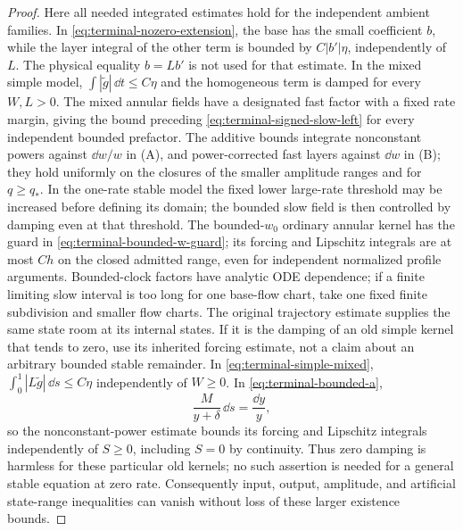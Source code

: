 \begin{proof}
Here all needed integrated estimates hold for the independent ambient
families.  In \eqref{eq:terminal-nozero-extension}, the base has the small
coefficient \(b\), while the layer integral of the other term is bounded
by \(C|b'|\eta\), independently of \(L\).  The physical equality
\(b=Lb'\) is not used for that estimate.  In the mixed simple model,
\(\int|\widetilde g|\,\dd t\le C\eta\) and the homogeneous term is
damped for every \(W,L>0\).  The mixed annular fields have a designated
fast factor with a fixed rate margin, giving the bound preceding
\eqref{eq:terminal-signed-slow-left} for every independent bounded
prefactor.  The additive bounds integrate nonconstant powers against
\(\dd w/w\) in (A), and power-corrected fast layers against \(\dd w\)
in (B); they hold uniformly on the closures of the smaller amplitude
ranges and for \(q\ge q_*\).  In the one-rate stable model the fixed
lower large-rate threshold may be increased before defining its domain;
the bounded slow field is then controlled by damping even at that
threshold.  The bounded-\(w_0\) ordinary annular kernel has the guard
in \eqref{eq:terminal-bounded-w-guard}; its forcing and Lipschitz
integrals are at most \(Ch\) on the closed admitted range, even for
independent normalized profile arguments.  Bounded-clock factors have
analytic ODE dependence; if a
finite limiting slow interval is too long for one base-flow chart, take
one fixed finite subdivision and smaller flow charts.  The original
trajectory estimate supplies the same state room at its internal states.
If it is the damping of an old simple kernel that tends to zero, use its
inherited forcing estimate, not a claim about an arbitrary bounded stable
remainder.  In \eqref{eq:terminal-simple-mixed},
\(\int_0^1|L\widetilde g|\,\dd s\le C\eta\) independently of
\(W\ge0\).  In \eqref{eq:terminal-bounded-a},
\[
 \frac{M}{y+\delta}\,\dd s=\frac{\dd y}{y},
\]
so the nonconstant-power estimate bounds its forcing and Lipschitz
integrals independently of \(S\ge0\), including \(S=0\) by continuity.
Thus zero damping is harmless for these particular old kernels; no such
assertion is needed for a general stable equation at zero rate.
Consequently input, output, amplitude, and artificial state-range
inequalities can vanish without loss of these larger existence bounds.


\end{proof}
